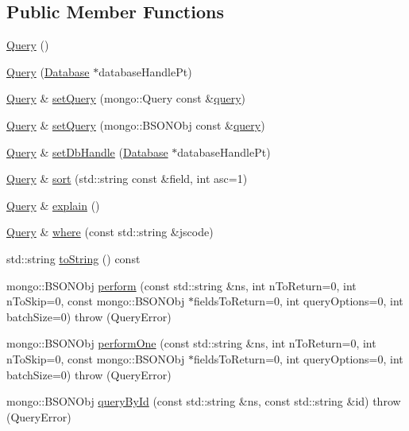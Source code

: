 \subsection*{Public Member Functions}
\begin{DoxyCompactItemize}
\item 
\hyperlink{classunisys_1_1Query_a9b8dec8e01ea5876edcd9899814176f4}{Query} ()
\item 
\hyperlink{classunisys_1_1Query_af17e3a152dbc1f76e63845b2f7259602}{Query} (\hyperlink{classunisys_1_1Database}{Database} $\ast$database\-Handle\-Pt)
\item 
\hyperlink{classunisys_1_1Query}{Query} \& \hyperlink{classunisys_1_1Query_aa186ae44601eec2e8961277edcbcff7c}{set\-Query} (mongo\-::\-Query const \&\hyperlink{classunisys_1_1Query_af86fd3dc2340b9b91452a47b338e5010}{query})
\item 
\hyperlink{classunisys_1_1Query}{Query} \& \hyperlink{classunisys_1_1Query_a93b1e5f1fc9644005468a5582d0c2dbd}{set\-Query} (mongo\-::\-B\-S\-O\-N\-Obj const \&\hyperlink{classunisys_1_1Query_af86fd3dc2340b9b91452a47b338e5010}{query})
\item 
\hyperlink{classunisys_1_1Query}{Query} \& \hyperlink{classunisys_1_1Query_a4436ed66a4a573dc942f767fbbbf5d13}{set\-Db\-Handle} (\hyperlink{classunisys_1_1Database}{Database} $\ast$database\-Handle\-Pt)
\item 
\hyperlink{classunisys_1_1Query}{Query} \& \hyperlink{classunisys_1_1Query_a85c3bad91cab280d4416462c3d7299de}{sort} (std\-::string const \&field, int asc=1)
\item 
\hyperlink{classunisys_1_1Query}{Query} \& \hyperlink{classunisys_1_1Query_a1c265602b716b6f7a04b557da3220ace}{explain} ()
\item 
\hyperlink{classunisys_1_1Query}{Query} \& \hyperlink{classunisys_1_1Query_a893cdb5bdb4a210bf8509c1f9d125b75}{where} (const std\-::string \&jscode)
\item 
std\-::string \hyperlink{classunisys_1_1Query_af547981311fe5334de85b0c2b078041e}{to\-String} () const 
\item 
mongo\-::\-B\-S\-O\-N\-Obj \hyperlink{classunisys_1_1Query_a6e33ab94af524a42c9cf990fa4b7de51}{perform} (const std\-::string \&ns, int n\-To\-Return=0, int n\-To\-Skip=0, const mongo\-::\-B\-S\-O\-N\-Obj $\ast$fields\-To\-Return=0, int query\-Options=0, int batch\-Size=0)  throw (\-Query\-Error)
\item 
mongo\-::\-B\-S\-O\-N\-Obj \hyperlink{classunisys_1_1Query_a6ba986cd88c6f422b2f1535ed158c1e3}{perform\-One} (const std\-::string \&ns, int n\-To\-Return=0, int n\-To\-Skip=0, const mongo\-::\-B\-S\-O\-N\-Obj $\ast$fields\-To\-Return=0, int query\-Options=0, int batch\-Size=0)  throw (\-Query\-Error)
\item 
mongo\-::\-B\-S\-O\-N\-Obj \hyperlink{classunisys_1_1Query_a64158cd5fd94611f0691f63a39f54a25}{query\-By\-Id} (const std\-::string \&ns, const std\-::string \&id)  throw (\-Query\-Error)
\end{DoxyCompactItemize}
